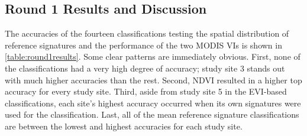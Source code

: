 \subsection*{Round 1 Results and Discussion}
\label{appendix:testing:r1:results}

The accuracies of the fourteen classifications testing the spatial distribution of reference signatures and the performance of the two MODIS VIs is shown in \autoref{table:round1results}. Some clear patterns are immediately obvious. First, none of the classifications had a very high degree of accuracy; study site 3 stands out with much higher accuracies than the rest. Second, NDVI resulted in a higher top accuracy for every study site. Third, aside from study site 5 in the EVI-based classifications, each site's highest accuracy occurred when its own signatures were used for the classification. Last, all of the mean reference signature classifications are between the lowest and highest accuracies for each study site.

